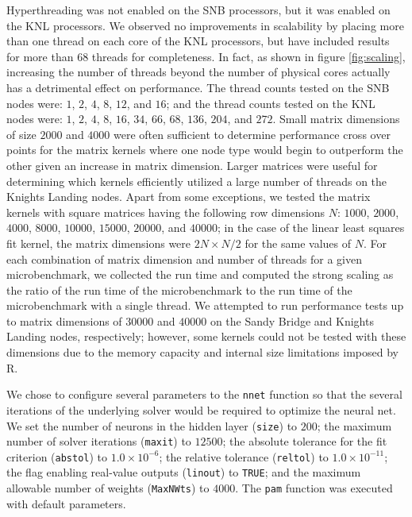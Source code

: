 Hyperthreading was not enabled on the SNB processors, but it was enabled on the KNL
processors. We observed no improvements in scalability by placing more than one thread on
each core of the KNL processors, but have included results for more than 68 threads for
completeness. In fact, as shown in figure \ref{fig:scaling}, increasing the number of
threads beyond the number of physical cores actually has a detrimental effect on
performance. The thread counts tested on the SNB nodes were: $1$, $2$, $4$, $8$, $12$, and
$16$; and the thread counts tested on the KNL nodes were: $1$, $2$, $4$, $8$, $16$, $34$,
$66$, $68$, $136$, $204$, and $272$. Small matrix dimensions of size $2000$ and $4000$
were often sufficient to determine performance cross over points for the matrix kernels
where one node type would begin to outperform the other given an increase in matrix
dimension. Larger matrices were useful for determining which kernels efficiently utilized
a large number of threads on the Knights Landing nodes. Apart from some exceptions, we
tested the matrix kernels with square matrices having the following row dimensions $N$:
$1000$, $2000$, $4000$, $8000$, $10000$, $15000$, $20000$, and $40000$; in the case of the
linear least squares fit kernel, the matrix dimensions were $2N \times N/2$ for the same values
of $N$. For each combination of matrix dimension and number of threads for a given
microbenchmark, we collected the run time and computed the strong scaling as the ratio of
the run time of the microbenchmark to the run time of the microbenchmark with a single
thread. We attempted to run performance tests up to matrix dimensions of $30000$ and
$40000$ on the Sandy Bridge and Knights Landing nodes, respectively; however, some kernels
could not be tested with these dimensions due to the memory capacity and internal size
limitations imposed by R.

We chose to configure several parameters to the \texttt{nnet} function so that
  the several iterations of the underlying solver would be required to optimize
  the neural net.
We set the number of neurons in the hidden layer (\texttt{size}) to $200$;
  the maximum number of solver iterations (\texttt{maxit}) to $12500$;
  the absolute tolerance for the fit criterion (\texttt{abstol}) to $1.0\times 10^{-6}$;
  the relative tolerance (\texttt{reltol}) to $1.0\times 10^{-11}$;
  the flag enabling real-value outputs (\texttt{linout}) to \texttt{TRUE}; and
  the maximum allowable number of weights (\texttt{MaxNWts}) to $4000$.
The \texttt{pam} function was executed with default parameters.

